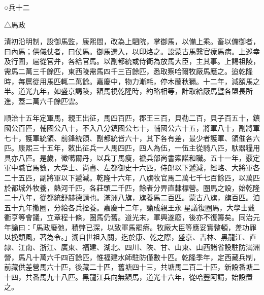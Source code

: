 
\begin{pinyinscope}
○兵十二

△馬政

清初沿明制，設御馬監，康熙間，改為上駟院，掌御馬，以備上乘。畜以備御者，曰內馬；供儀仗者，曰仗馬。御馬選入，以印烙之。設蒙古馬醫官療馬病。上巡幸及行圍，扈從官弁，各給官馬。以副都統或侍衛為放馬大臣，主其事。上謁祖陵，需馬二萬三千餘匹，東西陵需馬四千三百餘匹，悉取察哈爾牧廠馬應之。迨乾隆時，每扈從用馬匹輒二萬餘。嘉慶中，物力漸耗，停木蘭秋獮。十二年，減額馬之半。道光九年，如盛京謁陵，額馬視乾隆時，約略相等，計取給廠馬暨各盟長所進，蓋二萬六千餘匹雲。

順治十五年定軍馬，親王出征，馬四百匹，郡王三百，貝勒二百，貝子百五十，鎮國公百匹，輔國公八十，不入八分鎮國公七十，輔國公六十五，將軍八十，副將軍七十，護軍統領、前鋒統領、副都統皆六十，其下各有差，最少者護軍、領催各六匹。康熙三十五年，敕出征兵一人馬四匹，四人為伍，一伍主從騎八匹，馱器糧用具亦八匹。是歲，徵噶爾丹，以兵丁馬瘦，褫兵部尚書索諾和職。五十一年，覈定軍中職官馬數，大學士、尚書、左都御史十六匹，侍郎以下遞減，經略、大將軍各二十五匹，副將軍以下遞減。乾隆十六年，八旗牧官馬二萬七千七百餘匹，以萬匹於都城外牧養，熱河千匹，各莊頭二千匹，餘者分畀直隸標營。圈馬之設，始乾隆二十八年，從都統舒赫德請也。滿洲八旗，旗養馬二百匹。蒙古八旗，旗百匹。洎五十九年撤圈，分給各兵拴養。嘉慶十二年，諭成親王永星議復圈馬，大學士戴衢亨等會議，立章程十條，圈馬仍舊。道光末，軍興遂廢，後亦不復籌矣。同治元年諭曰：「馬政廢弛，積弊已深，以致軍馬罷瘠。牧廠大臣等應妥實整頓，差功罪以挽頹風，著為令。」溯自世祖入關，迄於康、乾之際，盛京、吉林、黑龍江、直隸、江南、浙江、廣東、福建、湖北、四川、陜、甘、山東、山西諸省設駐防滿洲營，馬凡十萬六千四百餘匹，惟福建水師駐防僅數十匹。乾隆季年，定西藏兵制，前藏供差營馬六十匹，後藏二十匹，舊塘四十三，共塘馬二百二十匹，新設番塘二十四，共番馬九十八匹。黑龍江兵向無額馬，道光十六年，從哈豐阿請，始設置之。


\end{pinyinscope}

